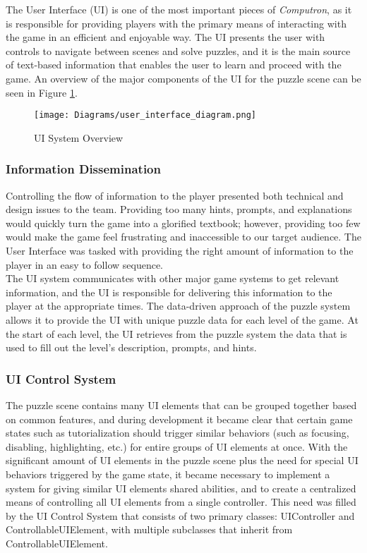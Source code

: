 The User Interface (UI) is one of the most important pieces of \textit{Computron}, as it is responsible for providing players with the primary means of interacting with the game in an efficient and enjoyable way. The UI presents the user with controls to navigate between scenes and solve puzzles, and it is the main source of text-based information that enables the user to learn and proceed with the game. An overview of the major components of the UI for the puzzle scene can be seen in Figure \ref{fig:ui_sytem_diagram}.\\

\begin{figure}[!hb]
    \caption{UI System Overview}
    \label{fig:ui_sytem_diagram}
    \centering
    \texttt{[image: Diagrams/user\_interface\_diagram.png]}
\end{figure}

\subsubsection{Information Dissemination}
Controlling the flow of information to the player presented both technical and design issues to the team. Providing too many hints, prompts, and explanations would quickly turn the game into a glorified textbook; however, providing too few would make the game feel frustrating and inaccessible to our target audience. The User Interface was tasked with providing the right amount of information to the player in an easy to follow sequence.\\

The UI system communicates with other major game systems to get relevant information, and the UI is responsible for delivering this information to the player at the appropriate times. The data-driven approach of the puzzle system allows it to provide the UI with unique puzzle data for each level of the game. At the start of each level, the UI retrieves from the puzzle system the data that is used to fill out the level's description, prompts, and hints.\\

\subsubsection{UI Control System}
The puzzle scene contains many UI elements that can be grouped together based on common features, and during development it became clear that certain game states such as tutorialization should trigger similar behaviors (such as focusing, disabling, highlighting, etc.) for entire groups of UI elements at once. With the significant amount of UI elements in the puzzle scene plus the need for special UI behaviors triggered by the game state, it became necessary to implement a system for giving similar UI elements shared abilities, and to create a centralized means of controlling all UI elements from a single controller. This need was filled by the UI Control System that consists of two primary classes: UIController and ControllableUIElement, with multiple subclasses that inherit from ControllableUIElement.\\


